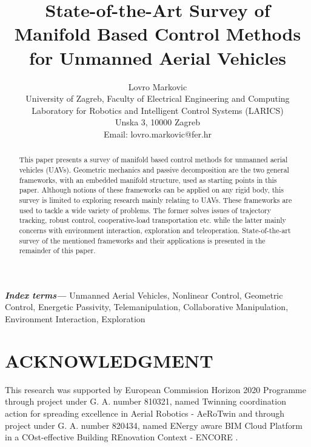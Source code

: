 \documentclass[letterpaper, 10 pt, conference]{ieeeconf}  %
\title{\LARGE \bf
State-of-the-Art Survey of Manifold Based Control Methods for Unmanned Aerial Vehicles
}
\author{Lovro Markovic \\
	University of Zagreb, Faculty of Electrical Engineering and Computing \\
	Laboratory for Robotics and Intelligent Control Systems (LARICS) \\
	Unska 3, 10000 Zagreb \\
	Email: lovro.markovic@fer.hr
}
\providecommand{\indexterms}[1]{\textbf{\textit{Index terms---}} #1}
\begin{document}
\maketitle

\thispagestyle{empty}
\pagestyle{empty}


\begin{abstract}
This paper presents a survey of manifold based control methods for unmanned aerial vehicles (UAVs). 
Geometric mechanics and passive decomposition are the two general frameworks, with an embedded manifold structure, used as starting points in this paper. Although notions of these frameworks can be applied on any rigid body, this survey is limited to exploring research mainly relating to UAVs. These frameworks are used to tackle a wide variety of problems. The former solves issues of trajectory tracking, robust control, cooperative-load transportation etc. while the latter mainly concerns with environment interaction, exploration and teleoperation. State-of-the-art survey of the mentioned frameworks and their applications is presented in the remainder of this paper.
\end{abstract}

\indexterms{Unmanned Aerial Vehicles, Nonlinear Control, Geometric Control, Energetic Passivity, Telemanipulation, Collaborative Manipulation, Environment Interaction, Exploration}







%


\section*{ACKNOWLEDGMENT}

This research was supported by European Commission Horizon 2020 Programme through project under G. A. number 810321, named Twinning coordination action for spreading excellence in Aerial Robotics - AeRoTwin \cite{AEROTWINweb} and through project under G. A. number 820434, named ENergy aware BIM Cloud Platform in a COst-effective Building REnovation Context - ENCORE \cite{ENCOREweb}.



\end{document}
